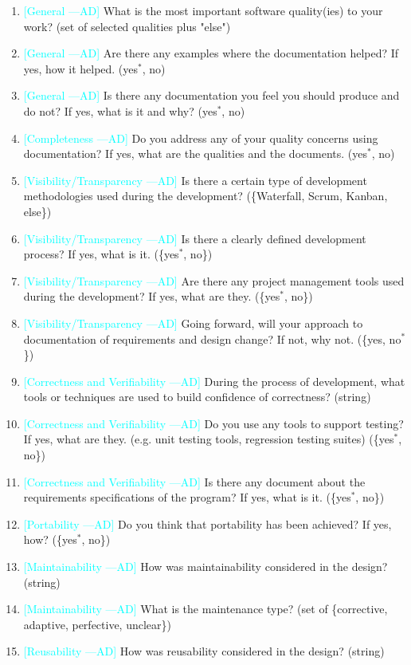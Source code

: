 \documentclass[12pt]{article}
\newcommand{\authornote}[3]{\textcolor{#1}{[#3 ---#2]}}
\newcommand{\authornote}[3]{}
\newcommand{\ad}[1]{\authornote{cyan}{AD}{#1}} %
\begin{document}
\begin{enumerate}
\item \ad{General} What is the most important software quality(ies) to your
work? (set of selected qualities plus "else")
\item \ad{General} Are there any examples where the documentation helped? If
yes, how it helped. ({yes$^*$, no})
\item \ad{General} Is there any documentation you feel you should produce and do
not? If yes, what is it and why? ({yes$^*$, no})
\item \ad{Completeness} Do you address any of your quality concerns using
documentation? If yes, what are the qualities and the documents. ({yes$^*$, no})
\item \ad{Visibility/Transparency} Is there a certain type of development
methodologies used during the development? (\{Waterfall, Scrum, Kanban, else\})
\item \ad{Visibility/Transparency} Is there a clearly defined development
process? If yes, what is it. (\{yes$^*$, no\})
\item \ad{Visibility/Transparency} Are there any project management tools used
during the development? If yes, what are they. (\{yes$^*$, no\})
\item \ad{Visibility/Transparency} Going forward, will your approach to
documentation of requirements and design
change? If not, why not. (\{yes, no$^*$\})
\item \ad{Correctness and Verifiability} During the process of development, what
tools or techniques are used to build confidence of correctness? (string)
\item \ad{Correctness and Verifiability} Do you use any tools to support
testing? If yes, what are they. (e.g. unit testing tools, regression testing
suites) (\{yes$^*$, no\})
\item \ad{Correctness and Verifiability} Is there any document about the
requirements specifications of the program? If yes, what is it. (\{yes$^*$,
no\})
\item \ad{Portability} Do you think that portability has been achieved? If yes,
how? (\{yes$^*$, no\})
\item \ad{Maintainability} How was maintainability considered in the design?
(string)
\item \ad{Maintainability} What is the maintenance type? (set of \{corrective,
adaptive, perfective,
unclear\})
\item \ad{Reusability} How was reusability considered in the design? (string)

\end{enumerate}
\end{document}
